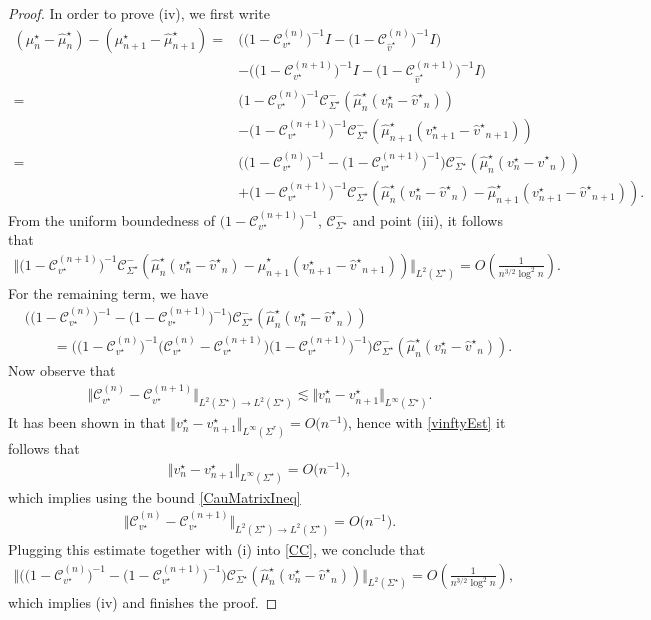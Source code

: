 \documentclass[10pt,a4paper]{amsart}
\newcommand{\Id}{I}
\newcommand{\smu}{\mu^\star}
\newcommand{\shmu}{\widehat \mu^\star}
\newcommand{\bv}{v}
\newcommand{\hv}{{\widehat v}}
\newcommand{\sbv}{v^\star}
\newcommand{\shv}{{\widehat v^\star}}
\newcommand{\sCau}{\mathcal C_{\Sigma^\star}}
\newcommand{\sCauv}{\mathcal C_{\bv^\star}}
\newcommand{\sCauhv}{\mathcal C_{\hv^\star}}
\newcommand{\Sigr}{\Sigma^r}
\numberwithin{equation}{section}
\begin{document}
\begin{proof}
In order to prove (iv), we first write
\begin{align*}
 (\smu_n - \shmu_n)-(\smu_{n+1} - \shmu_{n+1})={}&\big(\big(1-\sCauv^{(n)}\big)^{-1} \Id - \big(1-\sCauhv^{(n)}\big)^{-1}\Id\big)
 \\
 &-\big(\big(1-\sCauv^{(n+1)}\big)^{-1} \Id - \big(1-\sCauhv^{(n+1)}\big)^{-1}\Id\big)
 \\
={}& \big(1-\sCauv^{(n)}\big)^{-1}\sCau^-(\shmu_n(\sbv_n-\shv_n))
 \\
 & -\big(1-\sCauv^{(n+1)}\big)^{-1}\sCau^-(\shmu_{n+1}(\sbv_{n+1}-\shv_{n+1}))
 \\
={}& \big(\big(1-\sCauv^{(n)}\big)^{-1}-\big(1-\sCauv^{(n+1)}\big)^{-1}\big)\sCau^-(\shmu_n(\sbv_n-\shv_n))
 \\
 & + \big(1-\sCauv^{(n+1)}\big)^{-1}\sCau^-(\shmu_n(\sbv_n-\shv_n)-\shmu_{n+1}(\sbv_{n+1}-\shv_{n+1})).
\end{align*}
From the uniform boundedness of $\big(1-\sCauv^{(n+1)}\big)^{-1}$, $\sCau^-$ and point (iii), it follows that
\begin{align*}
 \big\Vert \big(1-\sCauv^{(n+1)}\big)^{-1}\sCau^-(\shmu_n(\sbv_n-\shv_n)-\shmu_{n+1}(\sbv_{n+1}-\shv_{n+1})) \big\Vert_{L^2(\Sigma^\star)} = O\left(\frac{1}{n^{3/2}\log^2 n}\right).
\end{align*}
For the remaining term, we have
\begin{align}
 &\big(\big(1-\sCauv^{(n)}\big)^{-1}-\big(1-\sCauv^{(n+1)}\big)^{-1}\big)\sCau^-(\shmu_n(\sbv_n-\shv_n))\nonumber
 \\
 &\qquad= \big(\big(1-\sCauv^{(n)}\big)^{-1}\big(\sCauv^{(n)}-\sCauv^{(n+1)}\big)\big(1-\sCauv^{(n+1)}\big)^{-1}\big)\sCau^-(\shmu_n(\sbv_n-\shv_n)).\label{CC}
\end{align}
Now observe that
\begin{align}\label{CauMatrixIneq}
 \big\Vert \sCauv^{(n)}-\sCauv^{(n+1)} \big\Vert_{L^2(\Sigma^\star)\to L^2(\Sigma^\star)} \lesssim \Vert \sbv_n - \sbv_{n+1} \Vert_{L^\infty(\Sigma^\star)}.
\end{align}
It has been shown in \cite[p.~54]{CD} that $\Vert \sbv_n - \sbv_{n+1} \Vert_{L^\infty(\Sigr)}=O\big(n^{-1}\big)$, hence with \eqref{vinftyEst} it follows that
\begin{align*}
 \Vert \sbv_n - \sbv_{n+1} \Vert_{L^\infty(\Sigma^\star)} = O\big(n^{-1}\big),
\end{align*}
which implies using the bound \eqref{CauMatrixIneq}
\begin{align*}
 \big\Vert \sCauv^{(n)}-\sCauv^{(n+1)} \big\Vert_{L^2(\Sigma^\star)\to L^2(\Sigma^\star)} = O\big(n^{-1}\big).
\end{align*}
Plugging this estimate together with (i) into \eqref{CC}, we conclude that
\begin{align*}
 \big\Vert \big(\big(1-\sCauv^{(n)}\big)^{-1}-\big(1-\sCauv^{(n+1)}\big)^{-1}\big)\sCau^-(\shmu_n(\sbv_n-\shv_n))\big\Vert_{L^2(\Sigma^\star)} = O\left(\frac{1}{n^{3/2}\log^2 n}\right),
\end{align*}
which implies (iv) and finishes the proof.
\end{proof}
\end{document}
